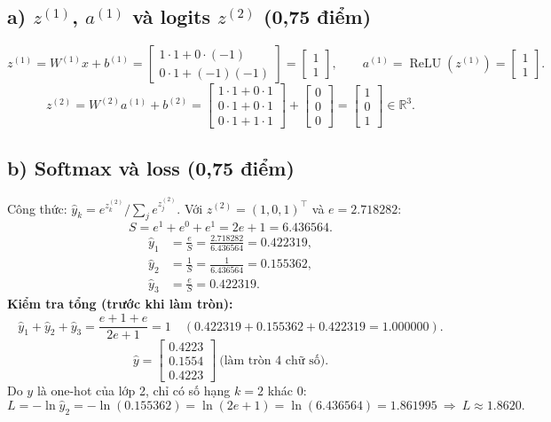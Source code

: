 \documentclass[12pt,a4paper]{article}
\newcommand{\relu}{\operatorname{ReLU}}
\begin{document}
\subsection*{a) $z^{(1)}$, $a^{(1)}$ và logits $z^{(2)}$ (0,75 điểm)}
\[
z^{(1)}=W^{(1)}x+b^{(1)}=\begin{bmatrix}1\cdot1+0\cdot(-1)\\0\cdot1+(-1)(-1)\end{bmatrix}=\begin{bmatrix}1\\1\end{bmatrix},\qquad
a^{(1)}=\relu(z^{(1)})=\begin{bmatrix}1\\1\end{bmatrix}.
\]
\[
z^{(2)}=W^{(2)}a^{(1)}+b^{(2)}=\begin{bmatrix}1\cdot1+0\cdot1\\0\cdot1+0\cdot1\\0\cdot1+1\cdot1\end{bmatrix}+\begin{bmatrix}0\\0\\0\end{bmatrix}
=\boxed{\begin{bmatrix}1\\0\\1\end{bmatrix}}\in\mathbb R^{3}.
\]

\subsection*{b) Softmax và loss (0,75 điểm)}

Công thức: $\hat y_k=e^{z^{(2)}_k}/\sum_j e^{z^{(2)}_j}$. Với $z^{(2)}=(1,0,1)^{\top}$ và $e=2.718282$:
\[
S=e^1+e^0+e^1=2e+1=6.436564 .
\]
\begin{align*}
\hat y_1&=\frac{e}{S}=\frac{2.718282}{6.436564}=0.422319,\\
\hat y_2&=\frac{1}{S}=\frac{1}{6.436564}=0.155362,\\
\hat y_3&=\frac{e}{S}=0.422319.
\end{align*}
\textbf{Kiểm tra tổng (trước khi làm tròn):}
\[
\hat y_1+\hat y_2+\hat y_3=\frac{e+1+e}{2e+1}=1 \quad(0.422319+0.155362+0.422319=1.000000).
\]
\[
\hat y=\begin{bmatrix}0.4223\\0.1554\\0.4223\end{bmatrix}\ \text{(làm tròn 4 chữ số)}.
\]
Do $y$ là one-hot của lớp 2, chỉ có số hạng $k=2$ khác 0:
\[
L=-\ln\hat y_2=-\ln(0.155362)=\ln(2e+1)=\ln(6.436564)=1.861995\ \Rightarrow\ \boxed{L\approx1.8620}.
\]
\end{document}
